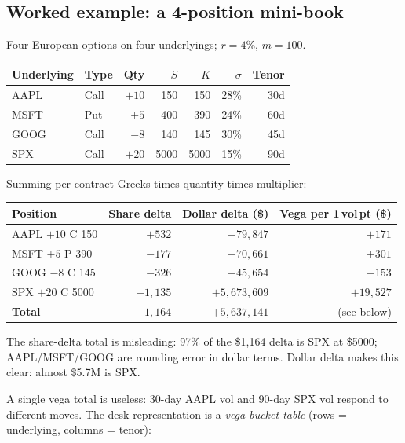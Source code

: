\subsection{Worked example: a 4-position mini-book}
\label{sec:mini_book}

Four European options on four underlyings; $r = 4\%$, $m = 100$.

\begin{center}
\small
\begin{tabular}{@{}llrrrrr@{}}
\toprule
Underlying & Type & Qty & $S$ & $K$ & $\sigma$ & Tenor \\
\midrule
AAPL & Call & $+10$ & 150  & 150  & 28\% & 30d  \\
MSFT & Put  & $+5$  & 400  & 390  & 24\% & 60d  \\
GOOG & Call & $-8$  & 140  & 145  & 30\% & 45d  \\
SPX  & Call & $+20$ & 5000 & 5000 & 15\% & 90d  \\
\bottomrule
\end{tabular}
\end{center}

Summing per-contract Greeks times quantity times multiplier:

\begin{center}
\small
\begin{tabular}{@{}lrrr@{}}
\toprule
Position & Share delta & Dollar delta (\$) & Vega per 1\,vol\,pt (\$) \\
\midrule
AAPL $+10$ C 150  & $+532$  & $+79{,}847$    & $+171$ \\
MSFT $+5$  P 390  & $-177$  & $-70{,}661$    & $+301$ \\
GOOG $-8$  C 145  & $-326$  & $-45{,}654$    & $-153$ \\
SPX  $+20$ C 5000 & $+1{,}135$ & $+5{,}673{,}609$ & $+19{,}527$ \\
\midrule
\textbf{Total}    & $+1{,}164$ & $+5{,}637{,}141$ & (see below) \\
\bottomrule
\end{tabular}
\end{center}

The share-delta total is misleading: 97\% of the \$1{,}164 delta is
SPX at \$5000; AAPL/MSFT/GOOG are rounding error in dollar
terms.  Dollar delta makes this clear: almost \$5.7M is SPX.

A single vega total is useless: 30-day AAPL vol and 90-day SPX
vol respond to different moves.  The desk representation is a
\emph{vega bucket table} (rows = underlying, columns = tenor):


